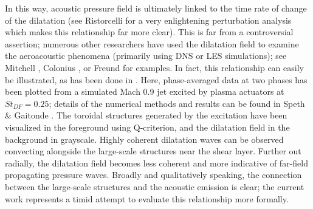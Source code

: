 In this way, acoustic pressure field is ultimately linked to the time rate of change of the dilatation (see Ristorcelli \citep{Ristorcelli1997} for a very enlightening perturbation analysis which makes this relationship far more clear).
This is far from a controversial assertion; numerous other researchers have used the dilatation field to examine the aeroacoustic phenomena (primarily using DNS or LES simulations); see Mitchell \etal \citep{Mitchell1995}, Colonius \etal \citep{Colonius1997}, or Freund \etal \citep{Freund2000} for examples.
In fact, this relationship can easily be illustrated, as has been done in . 
Here, phase-averaged data at two phases has been plotted from a simulated Mach 0.9 jet excited by plasma actuators at $St_{DF} = 0.25$; details of the numerical methods and results can be found in Speth \& Gaitonde \citep{Speth2014}. 
The toroidal structures generated by the excitation have been visualized in the foreground using Q-criterion, and the dilatation field in the background in grayscale.
Highly coherent dilatation waves can be observed convecting alongside the large-scale structures near the shear layer. 
Further out radially, the dilatation field becomes less coherent and more indicative of far-field propagating pressure waves.
Broadly and qualitatively speaking, the connection between the large-scale structures and the acoustic emission is clear; the current work represents a timid attempt to evaluate this relationship more formally.
